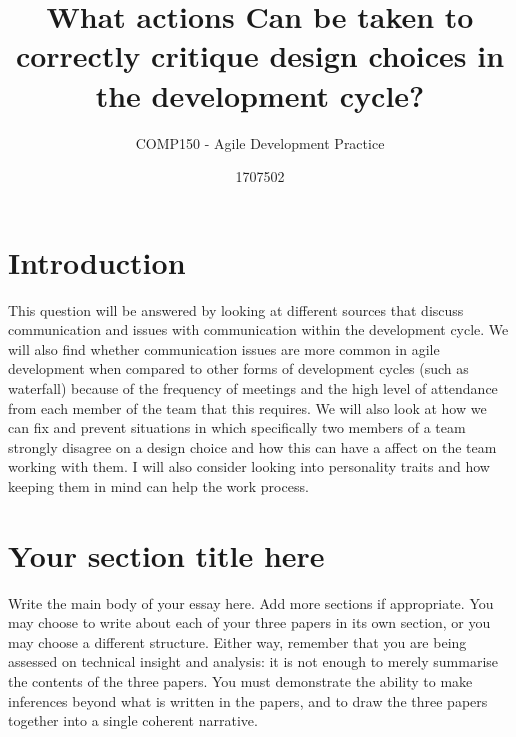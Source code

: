 \documentclass{scrartcl}
\title{What actions Can be taken to correctly critique design choices in the development cycle?}
\subtitle{COMP150 - Agile Development Practice}
\author{1707502}
\begin{document}
\maketitle


\section{Introduction}

This question will be answered by looking at different sources that discuss communication and issues with communication within the development cycle. We will also find whether communication issues are more common in agile development when compared to other forms of development cycles (such as waterfall) because of the frequency of meetings and the high level of attendance from each member of the team that this requires. We will also look at how we can fix and prevent situations in which specifically two members of a team strongly disagree on a design choice and how this can have a affect on the team working with them. I will also consider looking into personality traits and how keeping them in mind can help the work process.

\section{Your section title here}

Write the main body of your essay here. Add more sections if appropriate. You may choose to write about each of your three papers in its own section, or you may choose a different structure. Either way, remember that you are being assessed on technical insight and analysis: it is not enough to merely summarise the contents of the three papers. You must demonstrate the ability to make inferences beyond what is written in the papers, and to draw the three papers together into a single coherent narrative.
\end{document}

